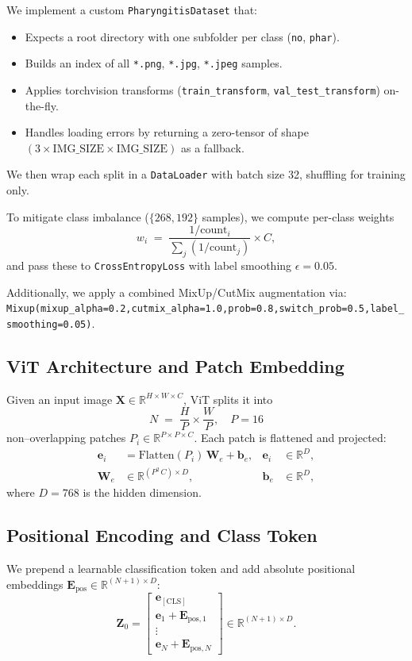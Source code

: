 We implement a custom \texttt{PharyngitisDataset} that:
\begin{itemize}
  \item Expects a root directory with one subfolder per class (\texttt{no}, \texttt{phar}).
  \item Builds an index of all \texttt{*.png}, \texttt{*.jpg}, \texttt{*.jpeg} samples.
  \item Applies torchvision transforms (\texttt{train\_transform}, \texttt{val\_test\_transform}) on-the-fly.
  \item Handles loading errors by returning a zero-tensor of shape $(3\times \text{IMG\_SIZE}\times \text{IMG\_SIZE})$ as a fallback.
\end{itemize}

We then wrap each split in a \texttt{DataLoader} with batch size 32, shuffling for training only.

To mitigate class imbalance (\(\{268,192\}\) samples), we compute per-class weights
\[
  w_i \;=\; \frac{1/\mathrm{count}_i}{\sum_j (1/\mathrm{count}_j)} \times C,
\]
and pass these to \texttt{CrossEntropyLoss} with label smoothing \(\epsilon=0.05\).

Additionally, we apply a combined MixUp/CutMix augmentation via:\newline
\texttt{Mixup(mixup\_alpha=0.2,cutmix\_alpha=1.0,prob=0.8,switch\_prob=0.5,label\_smoothing=0.05)}.

\subsection{ViT Architecture and Patch Embedding}
Given an input image \(\mathbf{X}\in\mathbb{R}^{H\times W\times C}\), ViT splits it into
\[
  N \;=\;\frac{H}{P}\times\frac{W}{P},
  \quad P=16
\]
non–overlapping patches \(P_i\in\mathbb{R}^{P\times P\times C}\). Each patch is flattened and projected:
\[
  \begin{aligned}
    \mathbf{e}_i &= \mathrm{Flatten}(P_i)\,\mathbf{W}_e + \mathbf{b}_e, 
      &\mathbf{e}_i &\in \mathbb{R}^D,\\
    \mathbf{W}_e &\in \mathbb{R}^{(P^2\,C)\times D}, 
      &\mathbf{b}_e &\in \mathbb{R}^D,
  \end{aligned}
\]
where \(D=768\) is the hidden dimension.

\subsection{Positional Encoding and Class Token}
We prepend a learnable classification token and add absolute positional embeddings \(\mathbf{E}_{\mathrm{pos}}\in\mathbb{R}^{(N+1)\times D}\):
\[
  \mathbf{Z}_0
  = 
  \begin{bmatrix}
    \mathbf{e}_{\mathrm{[CLS]}} \\[6pt]
    \mathbf{e}_1 + \mathbf{E}_{\mathrm{pos},1} \\[3pt]
    \vdots \\[3pt]
    \mathbf{e}_N + \mathbf{E}_{\mathrm{pos},N}
  \end{bmatrix}
  \in \mathbb{R}^{(N+1)\times D}.
\]

